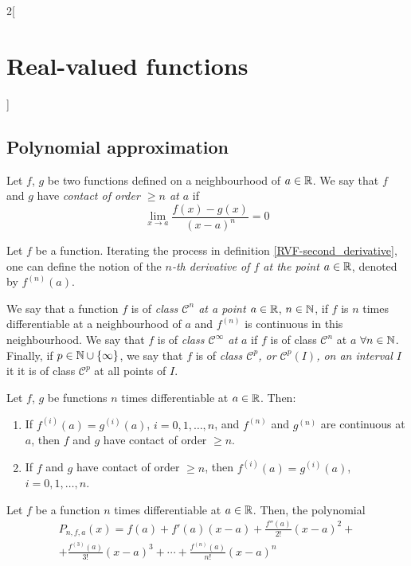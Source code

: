 \documentclass[../../../main.tex]{subfiles}
\begin{document}
\begin{multicols}{2}[\section{Real-valued functions}]
    \subsection{Polynomial approximation}
    \begin{definition}
        Let $f$, $g$ be two functions defined on a neighbourhood of $a\in\mathbb{R}$.  We say that $f$ and $g$ have \textit{contact of order $\geq n$ at $a$} if $$\lim_{x\to a}\frac{f(x)-g(x)}{{(x-a)}^n}=0$$
    \end{definition}
    \begin{definition}
        Let $f$ be a function. Iterating the process in definition \ref{RVF-second_derivative}, one can define the notion of the \textit{$n$-th derivative of $f$ at the point $a\in\mathbb{R}$}, denoted by $f^{(n)}(a)$.
    \end{definition}
    \begin{definition}
        We say that a function $f$ is of \textit{class $\mathcal{C}^n$ at a point $a\in\mathbb{R}$}, $n\in\mathbb{N}$, if $f$ is $n$ times differentiable at a neighbourhood of $a$ and $f^{(n)}$ is continuous in this neighbourhood. We say that $f$ is of \textit{class $\mathcal{C}^\infty$ at $a$} if $f$ is of class $\mathcal{C}^n$ at $a$ $\forall n\in\mathbb{N}$. Finally, if $p\in\mathbb{N}\cup\{\infty\}$, we say that $f$ is of \textit{class $\mathcal{C}^p$, or $\mathcal{C}^p(I)$, on an interval $I$} it it is of class $\mathcal{C}^p$ at all points of $I$.
    \end{definition}
    \begin{lemma}
        Let $f$, $g$ be functions $n$ times differentiable at $a\in\mathbb{R}$. Then:
        \begin{enumerate}
            \item If $f^{(i)}(a)=g^{(i)}(a)$, $i=0,1,\ldots,n$, and $f^{(n)}$ and $g^{(n)}$ are continuous at $a$, then $f$ and $g$ have contact of order $\geq n$.
            \item If $f$ and $g$ have contact of order $\geq n$, then $f^{(i)}(a)=g^{(i)}(a)$, $i=0,1,\ldots,n$.
        \end{enumerate}
    \end{lemma}
    \begin{theorem}
        Let $f$ be a function $n$ times differentiable at $a\in\mathbb{R}$. Then, the polynomial
        \begin{multline*}
            P_{n,f,a}(x)=f(a)+f'(a)(x-a)+\frac{f''(a)}{2!}{(x-a)}^2+\\+\frac{f^{(3)}(a)}{3!}{(x-a)}^3+\cdots+\frac{f^{(n)}(a)}{n!}{(x-a)}^n
        \end{multline*}

\end{theorem}
\end{multicols}
\end{document}
